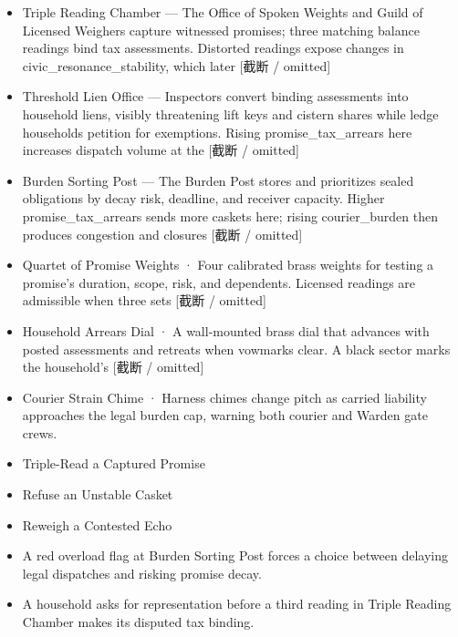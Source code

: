 \documentclass[10pt,a4paper]{article}
\newcommand{\heading}[1]{\par\vspace{5pt}{\color{teal}\bfseries #1}\par}
\begin{document}
\begin{minipage}[t]{0.48\linewidth}\fontsize{9}{12}\selectfont\raggedright\setlength{\parskip}{0pt}
\heading{地点与用途}\begin{itemize}
\item Triple Reading Chamber — The Office of Spoken Weights and Guild of Licensed Weighers capture witnessed promises; three matching balance readings bind tax assessments. Distorted readings expose changes in civic\_resonance\_stability, which later [截断 / omitted]
\item Threshold Lien Office — Inspectors convert binding assessments into household liens, visibly threatening lift keys and cistern shares while ledge households petition for exemptions. Rising promise\_tax\_arrears here increases dispatch volume at the [截断 / omitted]
\item Burden Sorting Post — The Burden Post stores and prioritizes sealed obligations by decay risk, deadline, and receiver capacity. Higher promise\_tax\_arrears sends more caskets here; rising courier\_burden then produces congestion and closures [截断 / omitted]
\end{itemize}
\heading{物件}\begin{itemize}
\item Quartet of Promise Weights · Four calibrated brass weights for testing a promise's duration, scope, risk, and dependents. Licensed readings are admissible when three sets [截断 / omitted]
\item Household Arrears Dial · A wall-mounted brass dial that advances with posted assessments and retreats when vowmarks clear. A black sector marks the household's [截断 / omitted]
\item Courier Strain Chime · Harness chimes change pitch as carried liability approaches the legal burden cap, warning both courier and Warden gate crews.
\end{itemize}
\heading{可能采取的行动}\begin{itemize}
\item Triple-Read a Captured Promise
\item Refuse an Unstable Casket
\item Reweigh a Contested Echo
\end{itemize}
\heading{玩家进入方式}\begin{itemize}
\item A red overload flag at Burden Sorting Post forces a choice between delaying legal dispatches and risking promise decay.
\item A household asks for representation before a third reading in Triple Reading Chamber makes its disputed tax binding.
\end{itemize}
\end{minipage}
\end{document}

